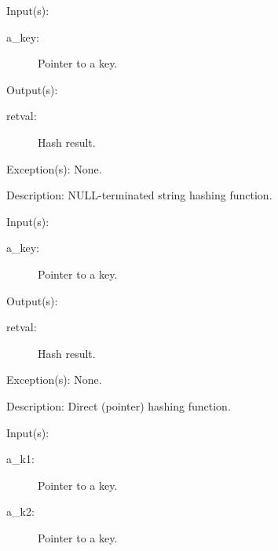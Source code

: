 \begin{capi}
	\begin{capilist}
	\item[Input(s): ]
		\begin{description}\item[]
		\item[a\_key: ]
			Pointer to a key.
		\end{description}
	\item[Output(s): ]
		\begin{description}\item[]
		\item[retval: ]
			Hash result.
		\end{description}
	\item[Exception(s): ] None.
	\item[Description: ]
		NULL-terminated string hashing function.
	\end{capilist}
\label{ch_direct_hash}
	\begin{capilist}
	\item[Input(s): ]
		\begin{description}\item[]
		\item[a\_key: ]
			Pointer to a key.
		\end{description}
	\item[Output(s): ]
		\begin{description}\item[]
		\item[retval: ]
			Hash result.
		\end{description}
	\item[Exception(s): ] None.
	\item[Description: ]
		Direct (pointer) hashing function.
	\end{capilist}
\label{ch_string_key_comp}
	\begin{capilist}
	\item[Input(s): ]
		\begin{description}\item[]
		\item[a\_k1: ]
			Pointer to a key.
		\item[a\_k2: ]
			Pointer to a key.
		\end{description}

\end{capilist}
\end{capi}
